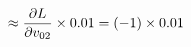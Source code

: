 \documentclass[preview]{standalone}
\begin{document}
\begin{align*}
\special{dvisvgm:raw <g id='unique000'>}\approx\frac{\partial L}{\partial v_{02}}\times0.01=(-1)\times0.01\special{dvisvgm:raw </g>}
\end{align*}
\end{document}
